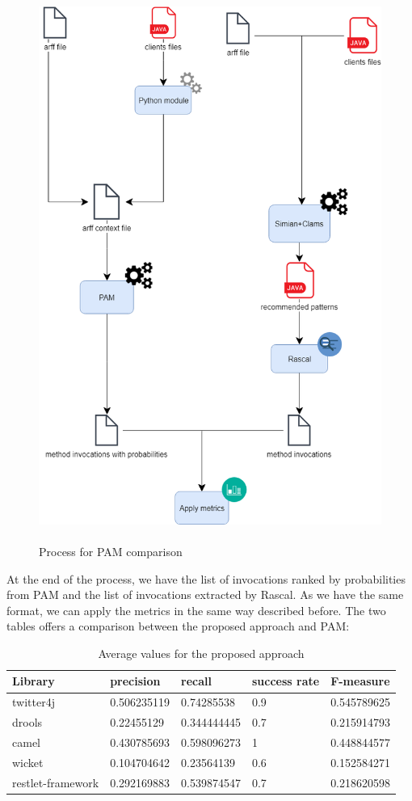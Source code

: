 \begin{figure}[!h]
\includegraphics[width=18cm,height=18cm,keepaspectratio]{images/PAM.png}
\centering
  \caption{Process for PAM comparison}
  \label{fig:cmd}
\end{figure}
 At the end of the process, we have the list of invocations ranked by probabilities from PAM and the list of invocations extracted by Rascal. As we have the same format, we can apply the metrics in the same way described before. The two tables offers a comparison between the proposed approach and PAM: 

\begin{table}[!h]

\begin{tabular}{|p{3.5cm}|p{2.0cm}|p{2.0cm}|p{2.5cm}|p{2.0cm}|}\hline
	 \textbf{Library} & \textbf{precision}  & \textbf{recall} & \textbf{success rate} & \textbf{F-measure} \\\hline
	 twitter4j &  0.506235119 & 0.74285538 &  0.9 & 0.545789625 \\\hline
	drools & 0.22455129 &   0.344444445 & 0.7 & 0.215914793\\\hline
	camel & 0.430785693  & 0.598096273 & 1 & 0.448844577 \\\hline 
	wicket & 0.104704642 & 0.23564139 & 0.6 & 0.152584271 \\\hline
	restlet-framework &  0.292169883 &  0.539874547 & 0.7 & 0.218620598  \\\hline
\end{tabular}
\caption{ Average values for the proposed approach }\label{Table:8}
\end{table} 

